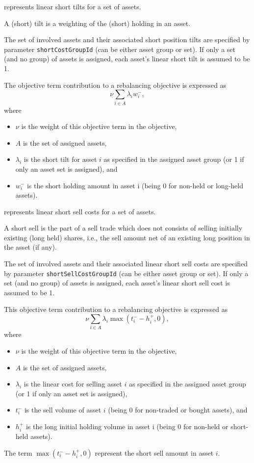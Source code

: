      represents linear short tilts for a set of assets. 

     A (short) tilt is a weighting of the (short) holding in an asset. 

     The set of involved assets and their associated short position tilts are specified by parameter
     \texttt{short\allowbreak{}Cost\allowbreak{}GroupId}
     (can be either asset group or set). 
     If only a set (and no group) of assets is assigned, each asset's linear short tilt is assumed to be 1. 

     The objective term contribution to a rebalancing objective is expressed as 
     \[
        \nu\sum_{i\in A}\lambda_i w_i^-,
     \]
     where
     \begin{itemize}
		  \item $\nu$ is the weight of this objective term in the objective, 
		  \item $A$ is the set of assigned assets, 
		  \item $\lambda_i$ is the short tilt for asset $i$ as specified in the assigned asset group (or 1 if only an asset set is assigned), and 
		  \item $w_i^-$ is the short holding amount in asset i (being 0 for non-held or long-held assets). 
     \end{itemize}

     represents linear short sell costs for a set of assets. 

     A short sell is the part of a sell trade which does not consists of selling initially existing (long held) shares, 
     i.e., the sell amount net of an existing long position in the asset (if any). 

     The set of involved assets and their associated linear short sell costs are specified by parameter
     \texttt{short\allowbreak{}Sell\allowbreak{}Cost\allowbreak{}GroupId}
     (can be either asset group or set).
     If only a set (and no group) of assets is assigned, each asset's linear short sell cost is assumed to be 1. 

     This objective term contribution to a rebalancing objective is expressed as 
     \[
         \nu \sum_{i \in A} \lambda_i \max(t_i^- - h_i^+, 0),
     \]
     where
     \begin{itemize}
		  \item $\nu$ is the weight of this objective term in the objective, 
		  \item $A$ is the set of assigned assets, 
		  \item $\lambda_i$ is the linear cost for selling asset $i$ as specified in the assigned asset group 
              (or 1 if only an asset set is assigned), 
        \item $t_i^-$ is the sell volume of asset $i$ (being 0 for non-traded or bought assets), and 
 		  \item $h_i^+$ is the long initial holding volume in asset i (being 0 for non-held or short-held assets). 
      \end{itemize}
     The term $\max(t_i^--h_i^+,0)$ represent the short sell amount in asset $i$.

